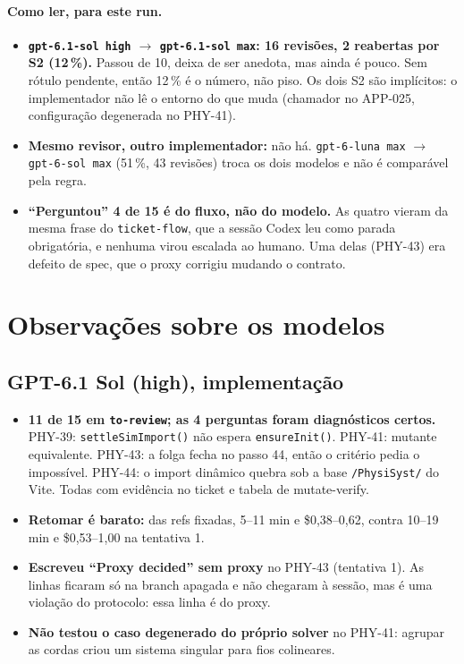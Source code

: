 \documentclass[11pt,a4paper]{article}
\begin{document}
\paragraph{Como ler, para este run.}
\begin{itemize}
  \item \textbf{\texttt{gpt-6.1-sol high} $\to$ \texttt{gpt-6.1-sol max}: 16
        revisões, 2 reabertas por S2 (12\,\%).} Passou de 10, deixa de ser
        anedota, mas ainda é pouco. Sem rótulo pendente, então 12\,\% é o
        número, não piso. Os dois S2 são implícitos: o implementador não lê o
        entorno do que muda (chamador no APP-025, configuração degenerada no
        PHY-41).
  \item \textbf{Mesmo revisor, outro implementador:} não há.
        \texttt{gpt-6-luna max} $\to$ \texttt{gpt-6-sol max} (51\,\%, 43
        revisões) troca os dois modelos e não é comparável pela regra.
  \item \textbf{``Perguntou'' 4 de 15 é do fluxo, não do modelo.} As
        quatro vieram da mesma frase do \texttt{ticket-flow}, que a sessão Codex
        leu como parada obrigatória, e nenhuma virou escalada ao humano. Uma
        delas (PHY-43) era defeito de spec, que o proxy corrigiu mudando o
        contrato.
\end{itemize}

\section{Observações sobre os modelos}

\subsection*{GPT-6.1 Sol (high), implementação}
\begin{itemize}
  \item \textbf{11 de 15 em \texttt{to-review}; as 4 perguntas foram
        diagnósticos certos.} PHY-39: \texttt{settleSimImport()} não espera
        \texttt{ensureInit()}. PHY-41: mutante equivalente. PHY-43: a folga
        fecha no passo 44, então o critério pedia o impossível. PHY-44: o
        import dinâmico quebra sob a base \texttt{/PhysiSyst/} do Vite. Todas
        com evidência no ticket e tabela de mutate-verify.
  \item \textbf{Retomar é barato:} das refs fixadas, 5--11 min e
        \$0,38--0,62, contra 10--19 min e \$0,53--1,00 na tentativa 1.
  \item \textbf{Escreveu ``Proxy decided'' sem proxy} no PHY-43 (tentativa
        1). As linhas ficaram só na branch apagada e não chegaram à sessão,
        mas é uma violação do protocolo: essa linha é do proxy.
  \item \textbf{Não testou o caso degenerado do próprio solver} no PHY-41:
        agrupar as cordas criou um sistema singular para fios colineares.
\end{itemize}
\end{document}
